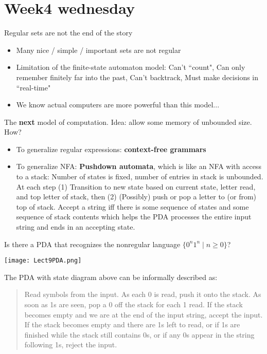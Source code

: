 \documentclass[12pt, oneside]{article}
\begin{document}
\begin{flushright}
\end{flushright} \section*{Week4 wednesday}


Regular sets are not the end of the story
\begin{itemize}
    \item Many nice / simple / important sets are not regular
    \item Limitation of the finite-state automaton model: Can't ``count", Can only remember finitely far into the past,
    Can't backtrack, Must make decisions in ``real-time"
    \item We know actual computers are more powerful than this model...
\end{itemize}

The {\bf next} model of computation. Idea: allow some memory of unbounded size. How? 
\begin{itemize}
    \item To generalize regular expressions: {\bf context-free grammars}\\
    \item To generalize NFA: {\bf Pushdown automata}, which is like an NFA with access to a stack: 
    Number of states is fixed, number of entries in stack is unbounded. At each step
    (1) Transition to new state based on current state, letter read, and top letter of stack, then
    (2) (Possibly) push or pop a letter to (or from) top of stack. Accept a string iff
    there is some sequence of states and some sequence of stack contents 
    which helps the PDA processes the entire input string and ends in an accepting state.
\end{itemize}

\vfill

\vfill

Is there a PDA that recognizes the nonregular language $\{0^n1^n \mid n \geq 0 \}$?

\vfill

\newpage


\texttt{[image: Lect9PDA.png]}

The PDA with state diagram above can be informally described as:
\begin{quote}
    Read symbols from the input. As each 0 is read, push it onto the stack. 
    As soon as 1s are seen, pop a 0 off the stack for each 1 read. 
    If the stack becomes empty and we are at the end of the input string, accept the input. 
    If the stack becomes empty and there are 1s left to read, 
    or if 1s are finished while the stack still contains 0s, or if any 0s
    appear in the string following 1s, 
    reject the input.
\end{quote}
    
\end{document}
